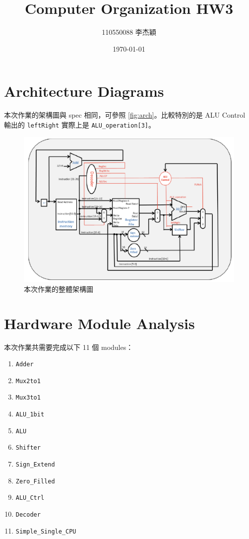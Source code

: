 \documentclass[twocolumn]{extarticle}
\title{Computer Organization HW3}
\author{110550088 李杰穎}
\date{\today}
\begin{document}
\maketitle

\section{Architecture Diagrams}

本次作業的架構圖與 spec 相同，可參照 \autoref{fig:arch}。比較特別的是 ALU Control 輸出的 \texttt{leftRight} 實際上是 \texttt{ALU\_operation[3]}。

\begin{figure}[htbp]
\centering
\includegraphics[width=0.95\linewidth]{arch}
\caption{本次作業的整體架構圖}
\label{fig:arch}
\end{figure}

\section{Hardware Module Analysis}

本次作業共需要完成以下 11 個 modules：

\begin{enumerate}
\item \texttt{Adder}
\item \texttt{Mux2to1}
\item \texttt{Mux3to1}
\item \texttt{ALU\_1bit}
\item \texttt{ALU}
\item \texttt{Shifter}
\item \texttt{Sign\_Extend}
\item \texttt{Zero\_Filled}
\item \texttt{ALU\_Ctrl}
\item \texttt{Decoder}
\item \texttt{Simple\_Single\_CPU}
\end{enumerate}
\end{document}

